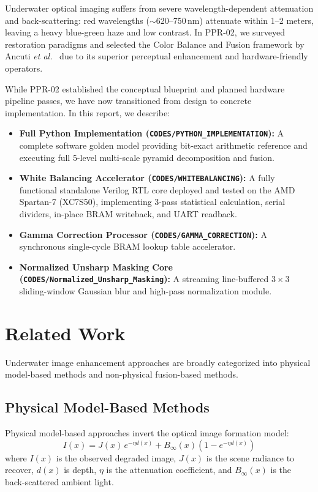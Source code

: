 \documentclass[10pt,twocolumn,letterpaper]{article}
\begin{document}
Underwater optical imaging suffers from severe wavelength-dependent attenuation and back-scattering: red wavelengths ($\sim$620--750\,nm) attenuate within 1--2 meters, leaving a heavy blue-green haze and low contrast. In PPR-02, we surveyed restoration paradigms and selected the Color Balance and Fusion framework by Ancuti \emph{et al.}~\cite{ancuti2018color} due to its superior perceptual enhancement and hardware-friendly operators.

While PPR-02 established the conceptual blueprint and planned hardware pipeline passes, we have now transitioned from design to concrete implementation. In this report, we describe:
\begin{itemize}
    \item \textbf{Full Python Implementation (\texttt{CODES/PYTHON\_IMPLEMENTATION}):} A complete software golden model providing bit-exact arithmetic reference and executing full 5-level multi-scale pyramid decomposition and fusion.
    \item \textbf{White Balancing Accelerator (\texttt{CODES/WHITEBALANCING}):} A fully functional standalone Verilog RTL core deployed and tested on the AMD Spartan-7 (XC7S50), implementing 3-pass statistical calculation, serial dividers, in-place BRAM writeback, and UART readback.
    \item \textbf{Gamma Correction Processor (\texttt{CODES/GAMMA\_CORRECTION}):} A synchronous single-cycle BRAM lookup table accelerator.
    \item \textbf{Normalized Unsharp Masking Core (\texttt{CODES/Normalized\_Unsharp\_Masking}):} A streaming line-buffered $3\times3$ sliding-window Gaussian blur and high-pass normalization module.
\end{itemize}

\section{Related Work}
\label{sec:related}

Underwater image enhancement approaches are broadly categorized into physical model-based methods and non-physical fusion-based methods.

\subsection{Physical Model-Based Methods}

Physical model-based approaches invert the optical image formation model:
\begin{equation}
  I(x) = J(x)\,e^{-\eta d(x)} + B_\infty(x)\!\left(1 - e^{-\eta d(x)}\right)
  \label{eq:ifm}
\end{equation}
where $I(x)$ is the observed degraded image, $J(x)$ is the scene radiance to recover, $d(x)$ is depth, $\eta$ is the attenuation coefficient, and $B_\infty(x)$ is the back-scattered ambient light.
\end{document}
